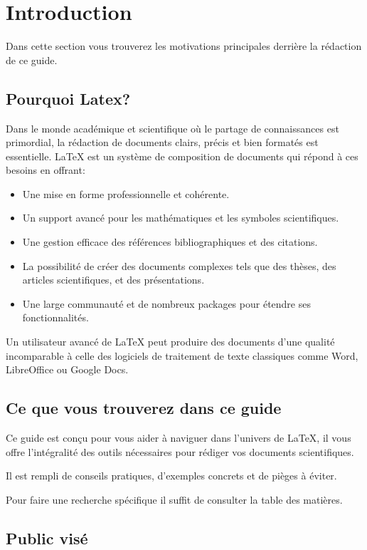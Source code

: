 \section{Introduction}\label{sec:intro}
Dans cette section vous trouverez les motivations
principales derrière la rédaction de ce guide.

\subsection{Pourquoi Latex?}\label{subsec:why_latex}

Dans le monde académique et scientifique où le partage de connaissances est primordial,
la rédaction de documents clairs, précis et bien formatés est essentielle.
LaTeX est un système de composition de documents qui répond à ces besoins en offrant:
\begin{itemize}
    \item Une mise en forme professionnelle et cohérente.
    \item Un support avancé pour les mathématiques et les symboles scientifiques.
    \item Une gestion efficace des références bibliographiques et des citations.
    \item La possibilité de créer des documents complexes tels que des thèses, des articles scientifiques, et des présentations.
    \item Une large communauté et de nombreux packages pour étendre ses fonctionnalités.
\end{itemize}

Un utilisateur avancé de LaTeX peut produire des documents d'une qualité 
incomparable à celle des logiciels de traitement de texte classiques comme
Word, LibreOffice ou Google Docs.


\subsection{Ce que vous trouverez dans ce guide}\label{subsec:what_you_will_find}

Ce guide est conçu pour vous aider à naviguer dans l'univers de LaTeX,
il vous offre l'intégralité des outils nécessaires pour rédiger vos documents scientifiques.

Il est rempli de conseils pratiques, d'exemples concrets et de pièges à éviter.

Pour faire une recherche spécifique il suffit de consulter la table des matières.

\subsection{Public visé}\label{subsec:target_audience}

